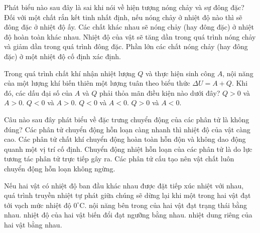 \begin{ex}%
	Phát biểu nào sau đây là sai khi nói về hiện tượng nóng chảy và sự đông đặc?
	\choice
	{Đối với một chất rắn kết tinh nhất định, nếu nóng chảy ở nhiệt độ nào thì sẽ đông đặc ở nhiệt độ ấy.}
	{Các chất khác nhau sẽ nóng chảy (hay đông đặc) ở nhiệt độ hoàn toàn khác nhau.}
	{\True Nhiệt độ của vật sẽ tăng dần trong quá trình nóng chảy và giảm dần trong quá trình đông đặc.}
	{Phần lớn các chất nóng chảy (hay đông đặc) ở một nhiệt độ cố định xác định.}
\end{ex}

\begin{ex}%
	Trong quá trình chất khí nhận nhiệt lượng $Q$ và thực hiện sinh công $A$, nội năng của một lượng khí biến thiên một lượng tuân theo biểu thức $\Delta U = A + Q$. Khi đó, các dấu đại số của $A$ và $Q$ phải thỏa mãn điều kiện nào dưới đây?
	\choice
	{$Q>0$ và $A>0$.}
	{ $Q<0$ và $A>0$.}
	{$Q<0$ và $A<0$.}
	{\True $Q>0$ và $A<0$.}
\end{ex}

\begin{ex}%
	Câu nào sau đây phát biểu về đặc trưng chuyển động của các phân tử là không đúng?
	\choice
	{Các phân tử chuyển động hỗn loạn càng nhanh thì nhiệt độ của vật càng cao.}
	{Các phân tử chất khí chuyển động hoàn toàn hỗn độn và không dao động quanh một vị trí cố định.}
	{\True Chuyển động nhiệt hỗn loạn của các phân tử là do lực tương tác phân tử trực tiếp gây ra.}
	{Các phân tử cấu tạo nên vật chất luôn chuyển động hỗn loạn không ngừng.}
\end{ex}

\begin{ex}%
	Nếu hai vật có nhiệt độ ban đầu khác nhau được đặt tiếp xúc nhiệt với nhau, quá trình truyền nhiệt tự phát giữa chúng sẽ dừng lại khi
	\choice
	{một trong hai vật đạt tới vạch mức nhiệt độ $0^\circ\text{C}$.}
	{nội năng bên trong của hai vật đạt trạng thái bằng nhau.}
	{\True nhiệt độ của hai vật biến đổi đạt ngưỡng bằng nhau.}
	{nhiệt dung riêng của hai vật bằng nhau.}
\end{ex}

